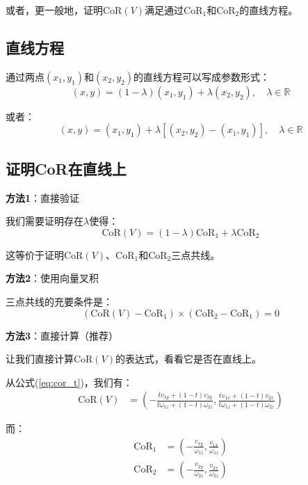 \documentclass[12pt,a4paper]{article}
\begin{document}
或者，更一般地，证明$\text{CoR}(V)$满足通过$\text{CoR}_1$和$\text{CoR}_2$的直线方程。

\subsection{直线方程}

通过两点$(x_1, y_1)$和$(x_2, y_2)$的直线方程可以写成参数形式：
\begin{equation}
(x, y) = (1-\lambda)(x_1, y_1) + \lambda(x_2, y_2), \quad \lambda \in \mathbb{R}
\end{equation}

或者：
\begin{equation}
(x, y) = (x_1, y_1) + \lambda[(x_2, y_2) - (x_1, y_1)], \quad \lambda \in \mathbb{R}
\end{equation}

\subsection{证明CoR在直线上}

\textbf{方法1}：直接验证

我们需要证明存在$\lambda$使得：
\begin{equation}
\text{CoR}(V) = (1-\lambda) \text{CoR}_1 + \lambda \text{CoR}_2
\end{equation}

这等价于证明$\text{CoR}(V)$、$\text{CoR}_1$和$\text{CoR}_2$三点共线。

\textbf{方法2}：使用向量叉积

三点共线的充要条件是：
\begin{equation}
(\text{CoR}(V) - \text{CoR}_1) \times (\text{CoR}_2 - \text{CoR}_1) = 0
\end{equation}

\textbf{方法3}：直接计算（推荐）

让我们直接计算$\text{CoR}(V)$的表达式，看看它是否在直线上。

从公式(\ref{eq:cor_t})，我们有：
\begin{align}
\text{CoR}(V) &= \left(-\frac{t v_{1y} + (1-t) v_{2y}}{t \omega_{1z} + (1-t) \omega_{2z}}, \frac{t v_{1x} + (1-t) v_{2x}}{t \omega_{1z} + (1-t) \omega_{2z}}\right)
\end{align}

而：
\begin{align}
\text{CoR}_1 &= \left(-\frac{v_{1y}}{\omega_{1z}}, \frac{v_{1x}}{\omega_{1z}}\right) \\
\text{CoR}_2 &= \left(-\frac{v_{2y}}{\omega_{2z}}, \frac{v_{2x}}{\omega_{2z}}\right)
\end{align}
\end{document}
